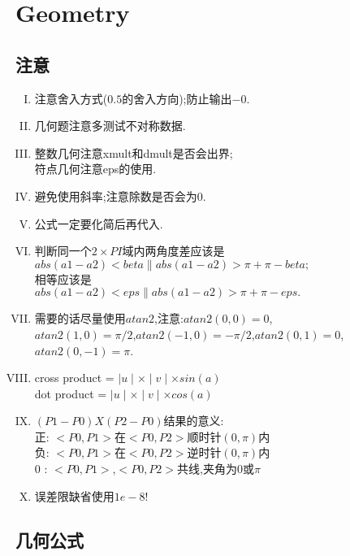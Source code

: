 \section{Geometry}
\large


\subsection{注意}
\begin{enumerate}[I. ]
	\item 注意舍入方式($0.5$的舍入方向);防止输出$-0$.
	\item 几何题注意多测试不对称数据.
	\item 整数几何注意xmult和dmult是否会出界;\\
	      符点几何注意eps的使用.
	\item 避免使用斜率;注意除数是否会为$0$.
	\item 公式一定要化简后再代入.
	\item 判断同一个$2\times PI$域内两角度差应该是\\
   		  $abs(a1-a2)<beta \parallel abs(a1-a2)>\pi+\pi-beta;$\\
          相等应该是\\
          $abs(a1-a2)<eps \parallel abs(a1-a2)>\pi+\pi-eps.$
    \item 需要的话尽量使用$atan2$,注意:$atan2(0,0)=0$,\\
          $atan2(1,0)=\pi/2$,$atan2(-1,0)=-\pi/2$,$atan2(0,1)=0$,$atan2(0,-1)=\pi$.
    \item cross product = $\mid u \mid\times \mid v\mid\times sin(a)$\\
          dot product = $\mid u \mid\times \mid v\mid\times cos(a)$
    \item $(P1-P0)X(P2-P0)$结果的意义:\\
          正: $<P0,P1>$在$<P0,P2>$顺时针$(0,\pi)$内\\
          负: $<P0,P1>$在$<P0,P2>$逆时针$(0,\pi)$内\\
          0 : $<P0,P1>$,$<P0,P2>$共线,夹角为$0$或$\pi$
    \item 误差限缺省使用$1e-8$!
\end{enumerate}


\subsection{几何公式}

